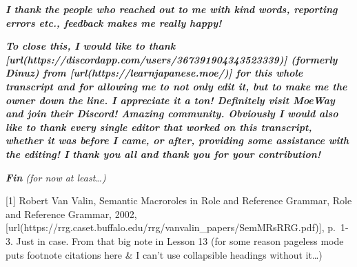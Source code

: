 {\bf {\em I thank the people who reached out to me with kind words, reporting errors etc., feedback makes me really happy!}}

{\bf {\em To close this, I would like to thank [url(https://discordapp.com/users/367391904343523339)] (formerly Dinuz) from [url(https://learnjapanese.moe/)] for this whole transcript and for allowing me to not only edit it, but to make me the owner down the line. I appreciate it a ton! Definitely visit MoeWay and join their Discord! Amazing community. Obviously I would also like to thank every single editor that worked on this transcript, whether it was before I came, or after, providing some assistance with the editing! I thank you all and thank you for your contribution!}}

{\em {\bf Fin} (for now at least\ldots{})}

{[}1{]} Robert Van Valin, Semantic Macroroles in Role and Reference Grammar, Role and Reference Grammar, 2002, [url(https://rrg.caset.buffalo.edu/rrg/vanvalin_papers/SemMRsRRG.pdf)], p.~1-3. Just in case. From that big note in Lesson 13 (for some reason pageless mode puts footnote citations here & I can't use collapsible headings without it\ldots{})

\stopsectionlevel

\stopsectionlevel

\stopsectionlevel

\stopsectionlevel
